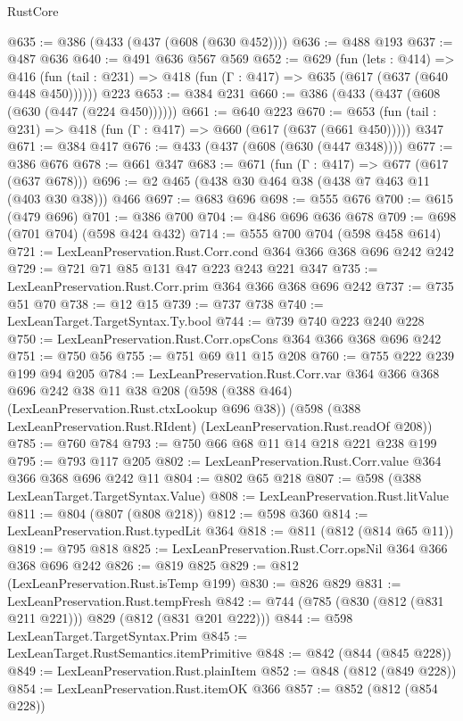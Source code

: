 \begin{lexlean}{RustCore}
\begin{coremodule}
@635 := @386 (@433 (@437 (@608 (@630 @452))))
@636 := @488 @193
@637 := @487 @636
@640 := @491 @636 @567 @569
@652 := @629
    (fun (lets : @414) =>
    @416 (fun (tail : @231) => @418 (fun (Γ : @417) => @635 (@617 (@637 (@640 @448 @450))))))
    @223
@653 := @384 @231
@660 := @386 (@433 (@437 (@608 (@630 (@447 (@224 @450))))))
@661 := @640 @223
@670 := @653 (fun (tail : @231) => @418 (fun (Γ : @417) => @660 (@617 (@637 (@661 @450))))) @347
@671 := @384 @417
@676 := @433 (@437 (@608 (@630 (@447 @348))))
@677 := @386 @676
@678 := @661 @347
@683 := @671 (fun (Γ : @417) => @677 (@617 (@637 @678)))
@696 := @2 @465 (@438 @30 @464 @38 (@438 @7 @463 @11 (@403 @30 @38))) @466
@697 := @683 @696
@698 := @555 @676
@700 := @615 (@479 @696)
@701 := @386 @700
@704 := @486 @696 @636 @678
@709 := @698 (@701 @704) (@598 @424 @432)
@714 := @555 @700 @704 (@598 @458 @614)
@721 := LexLeanPreservation.Rust.Corr.cond @364 @366 @368 @696 @242 @242
@729 := @721 @71 @85 @131 @47 @223 @243 @221 @347
@735 := LexLeanPreservation.Rust.Corr.prim @364 @366 @368 @696 @242
@737 := @735 @51 @70
@738 := @12 @15
@739 := @737 @738
@740 := LexLeanTarget.TargetSyntax.Ty.bool
@744 := @739 @740 @223 @240 @228
@750 := LexLeanPreservation.Rust.Corr.opsCons @364 @366 @368 @696 @242
@751 := @750 @56
@755 := @751 @69 @11 @15 @208
@760 := @755 @222 @239 @199 @94 @205
@784 := LexLeanPreservation.Rust.Corr.var
    @364
    @366
    @368
    @696
    @242
    @38
    @11
    @38
    @208
    (@598 (@388 @464) (LexLeanPreservation.Rust.ctxLookup @696 @38))
    (@598 (@388 LexLeanPreservation.Rust.RIdent) (LexLeanPreservation.Rust.readOf @208))
@785 := @760 @784
@793 := @750 @66 @68 @11 @14 @218 @221 @238 @199
@795 := @793 @117 @205
@802 := LexLeanPreservation.Rust.Corr.value @364 @366 @368 @696 @242 @11
@804 := @802 @65 @218
@807 := @598 (@388 LexLeanTarget.TargetSyntax.Value)
@808 := LexLeanPreservation.Rust.litValue
@811 := @804 (@807 (@808 @218))
@812 := @598 @360
@814 := LexLeanPreservation.Rust.typedLit @364
@818 := @811 (@812 (@814 @65 @11))
@819 := @795 @818
@825 := LexLeanPreservation.Rust.Corr.opsNil @364 @366 @368 @696 @242
@826 := @819 @825
@829 := @812 (LexLeanPreservation.Rust.isTemp @199)
@830 := @826 @829
@831 := LexLeanPreservation.Rust.tempFresh
@842 := @744 (@785 (@830 (@812 (@831 @211 @221))) @829 (@812 (@831 @201 @222)))
@844 := @598 LexLeanTarget.TargetSyntax.Prim
@845 := LexLeanTarget.RustSemantics.itemPrimitive
@848 := @842 (@844 (@845 @228))
@849 := LexLeanPreservation.Rust.plainItem
@852 := @848 (@812 (@849 @228))
@854 := LexLeanPreservation.Rust.itemOK @366
@857 := @852 (@812 (@854 @228))

\end{coremodule}
\end{lexlean}
